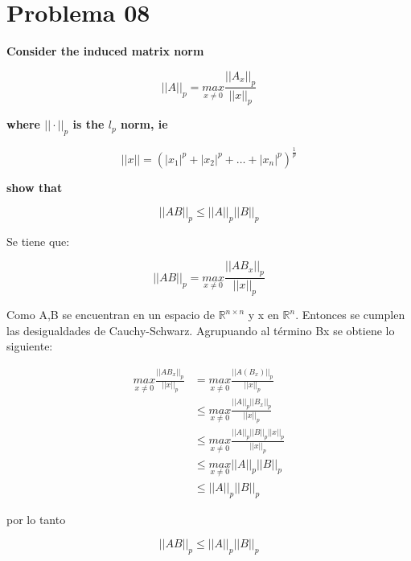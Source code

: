 \section*{Problema 08}


\textbf{Consider the induced matrix norm}

\begin{equation*}
    ||A||_p  = \underset{x\neq 0}{max} \frac{||A_x||_p}{||x||_p}
\end{equation*}

\textbf{where $||\cdot||_p$ is the $l_p$ norm, ie}

\begin{equation*}
    ||x|| = (|x_1|^p+|x_2|^p+\dots+|x_n|^p)^{\frac{1}{p}}
\end{equation*}

\textbf{show that }

\begin{equation*}
    ||AB||_p \le ||A||_p ||B||_p
\end{equation*}

Se tiene que:

\begin{equation*}
    ||AB||_p  = \underset{x\neq 0}{max} \frac{||AB_x||_p}{||x||_p}
\end{equation*}

Como A,B se encuentran en un espacio de $\mathbb{R}^{n\times n}$ y x en $\mathbb{R}^n$. Entonces se cumplen las desigualdades de Cauchy-Schwarz. Agrupuando al término Bx se obtiene lo siguiente:

\begin{align*}
    \underset{x\neq 0}{max} \frac{||AB_x||_p}{||x||_p} & = \underset{x\neq 0}{max} \frac{||A(B_x)||_p}{||x||_p}               \\
                                                       & \leq \underset{x\neq 0}{max} \frac{||A||_p||B_x||_p}{||x||_p}        \\
                                                       & \leq \underset{x\neq 0}{max} \frac{||A||_p ||B||_p ||x||_p}{||x||_p} \\
                                                       & \leq \underset{x\neq 0}{max} ||A||_p ||B||_p                         \\
                                                       & \leq ||A||_p ||B||_p
\end{align*}

por lo tanto

\begin{equation*}
    ||AB||_p \le ||A||_p ||B||_p
\end{equation*}